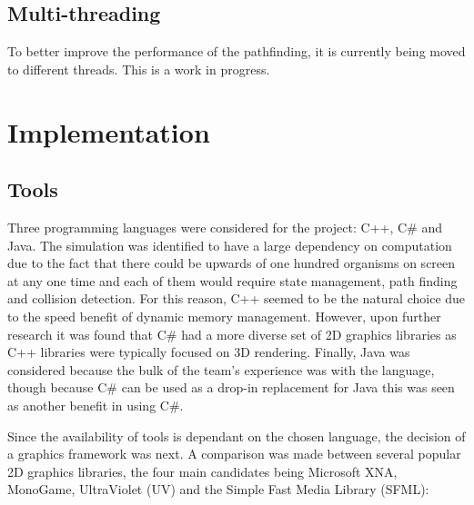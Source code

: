 \documentclass[a4paper, oneside, 11pt]{report}
\begin{document}
\section{Multi-threading}
To better improve the performance of the pathfinding, it is currently being moved to different threads. This is a work in progress.

\chapter{Implementation} \label{implementation}

\section{Tools}\label{tools}
Three programming languages were considered for the project: C++, C\# and Java. The simulation was identified to have a large dependency on computation due to the fact that there could be upwards of one hundred organisms on screen at any one time and each of them would require state management, path finding and collision detection. For this reason, C++ seemed to be the natural choice due to the speed benefit of dynamic memory management. However, upon further research it was found that C\# had a more diverse set of 2D graphics libraries as C++ libraries were typically focused on 3D rendering. Finally, Java was considered because the bulk of the team's experience was with the language, though because C\# can be used as a drop-in replacement for Java this was seen as another benefit in using C\#.

Since the availability of tools is dependant on the chosen language, the decision of a graphics framework was next. A comparison was made between several popular 2D graphics libraries, the four main candidates being Microsoft XNA, MonoGame, UltraViolet (UV) and the Simple Fast Media Library (SFML):
\end{document}
